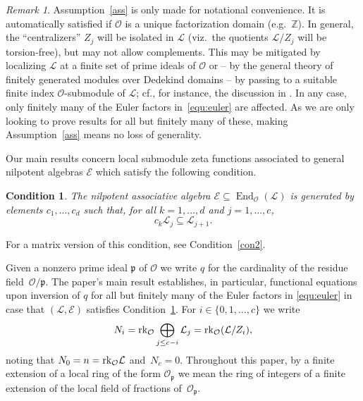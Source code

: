 \documentclass[11pt]{amsart}
\numberwithin{equation}{section}
\numberwithin{figure}{section}
\theoremstyle{plain}
\newtheorem{condition}{Condition}[section]
\theoremstyle{definition}
\theoremstyle{remark}
\newtheorem{remark}[theorem]{Remark}
\begin{document}
\begin{remark}\label{rem:ass}
  Assumption~\ref{ass} is only made for notational convenience. It is
  automatically satisfied if ${\ensuremath{\mathcal{O}}}$ is a unique factorization domain
  (e.g.\ ${\ensuremath{\mathbb{Z}}}$). In general, the ``centralizers'' $Z_j$ will be
  isolated in ${\ensuremath{\mathcal{L}}}$ (viz.\ the quotients ${\ensuremath{\mathcal{L}}} / Z_j$ will be
  torsion-free), but may not allow complements. This may be mitigated
  by localizing ${\ensuremath{\mathcal{L}}}$ at a finite set of prime ideals of ${\ensuremath{\mathcal{O}}}$ or --
  by the general theory of finitely generated modules over Dedekind
  domains -- by passing to a suitable finite index ${\ensuremath{\mathcal{O}}}$-submodule of
  ${\ensuremath{\mathcal{L}}}$; cf., for instance, the discussion in
  \cite[Section~2.3]{StasinskiVoll/14}. In any case, only finitely
  many of the Euler factors in~\eqref{equ:euler} are affected. As we
  are only looking to prove results for all but finitely many of
  these, making Assumption~\ref{ass} means no loss of generality.
\end{remark}

Our main results concern local submodule zeta functions associated to
general nilpotent algebras ${\mathcal{E}}$ which satisfy the following
condition.
\begin{condition}\label{con}  
  The nilpotent associative algebra ${\mathcal{E}}\subseteq \operatorname{End}_{\ensuremath{\mathcal{O}}}({\ensuremath{\mathcal{L}}})$
  is generated by elements $c_1,\dots,c_d$ such that, for all
  $k=1,\dots,d$ and $j=1,\dots,c$,
\begin{equation}\label{equ:shift}
 c_k {\ensuremath{\mathcal{L}}}_j \subseteq {\ensuremath{\mathcal{L}}}_{j+1}.
\end{equation}
\end{condition}

For a matrix version of this condition, see Condition~\ref{con2}.

Given a nonzero prime ideal ${\mathfrak{p}}$ of ${\mathcal{O}}$ we write $q$ for the
cardinality of the residue field~${\mathcal{O}}/{\mathfrak{p}}$. The paper's main result
establishes, in particular, functional equations upon inversion of $q$
for all but finitely many of the Euler factors in \eqref{equ:euler} in
case that $({\ensuremath{\mathcal{L}}},{\mathcal{E}})$ satisfies Condition~\ref{con}. For
$i\in\{0,1,\dots,c\}$ we write 
$$N_i = {\ensuremath{{\rm rk}}}_{\ensuremath{\mathcal{O}}} \bigoplus_{j \leq c-i}{\ensuremath{\mathcal{L}}}_j =
{\ensuremath{{\rm rk}}}_{\ensuremath{\mathcal{O}}}({\ensuremath{\mathcal{L}}}/Z_i),$$ noting that $N_0=n = {\ensuremath{{\rm rk}}}_{\ensuremath{\mathcal{O}}}{\ensuremath{\mathcal{L}}}$
and~$N_c=0$. Throughout this paper, by a finite extension of a local
ring of the form ${\ensuremath{\mathcal{O}}}_{\mathfrak{p}}$ we mean the ring of integers of a
finite extension of the local field of fractions of~${\ensuremath{\mathcal{O}}}_{\mathfrak{p}}$.
\end{document}
